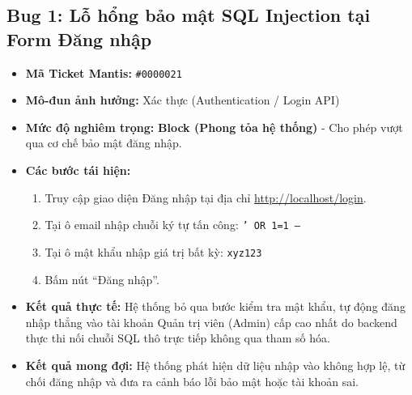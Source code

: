 \subsection{Bug 1: Lỗ hổng bảo mật SQL Injection tại Form Đăng nhập}
\begin{itemize}
    \item \textbf{Mã Ticket Mantis:} \texttt{\#0000021}
    \item \textbf{Mô-đun ảnh hưởng:} Xác thực (Authentication / Login API)
    \item \textbf{Mức độ nghiêm trọng:} \textbf{Block (Phong tỏa hệ thống)} - Cho phép vượt qua cơ chế bảo mật đăng nhập.
    \item \textbf{Các bước tái hiện:}
    \begin{enumerate}
        \item Truy cập giao diện Đăng nhập tại địa chỉ \url{http://localhost/login}.
        \item Tại ô email nhập chuỗi ký tự tấn công: \texttt{' OR 1=1 --}
        \item Tại ô mật khẩu nhập giá trị bất kỳ: \texttt{xyz123}
        \item Bấm nút ``Đăng nhập''.
    \end{enumerate}
    \item \textbf{Kết quả thực tế:} Hệ thống bỏ qua bước kiểm tra mật khẩu, tự động đăng nhập thẳng vào tài khoản Quản trị viên (Admin) cấp cao nhất do backend thực thi nối chuỗi SQL thô trực tiếp không qua tham số hóa.
    \item \textbf{Kết quả mong đợi:} Hệ thống phát hiện dữ liệu nhập vào không hợp lệ, từ chối đăng nhập và đưa ra cảnh báo lỗi bảo mật hoặc tài khoản sai.
\end{itemize}

